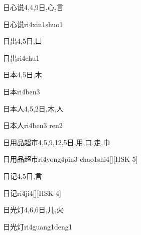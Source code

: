 \begin{Entry}{日心说}{4,4,9}{⽇,⼼,⾔}
  \begin{Phonetics}{日心说}{ri4xin1shuo1}
  \end{Phonetics}
\end{Entry}

\begin{Entry}{日出}{4,5}{⽇,⼐}
  \begin{Phonetics}{日出}{ri4chu1}
  \end{Phonetics}
\end{Entry}

\begin{Entry}{日本}{4,5}{⽇,⽊}
  \begin{Phonetics}{日本}{ri4ben3}
  \end{Phonetics}
\end{Entry}

\begin{Entry}{日本人}{4,5,2}{⽇,⽊,⼈}
  \begin{Phonetics}{日本人}{ri4ben3 ren2}
  \end{Phonetics}
\end{Entry}

\begin{Entry}{日用品超市}{4,5,9,12,5}{⽇,⽤,⼝,⾛,⼱}
  \begin{Phonetics}{日用品超市}{ri4yong4pin3 chao1shi4}[][HSK 5]
  \end{Phonetics}
\end{Entry}

\begin{Entry}{日记}{4,5}{⽇,⾔}
  \begin{Phonetics}{日记}{ri4ji4}[][HSK 4]
  \end{Phonetics}
\end{Entry}

\begin{Entry}{日光灯}{4,6,6}{⽇,⼉,⽕}
  \begin{Phonetics}{日光灯}{ri4guang1deng1}
  \end{Phonetics}
\end{Entry}

